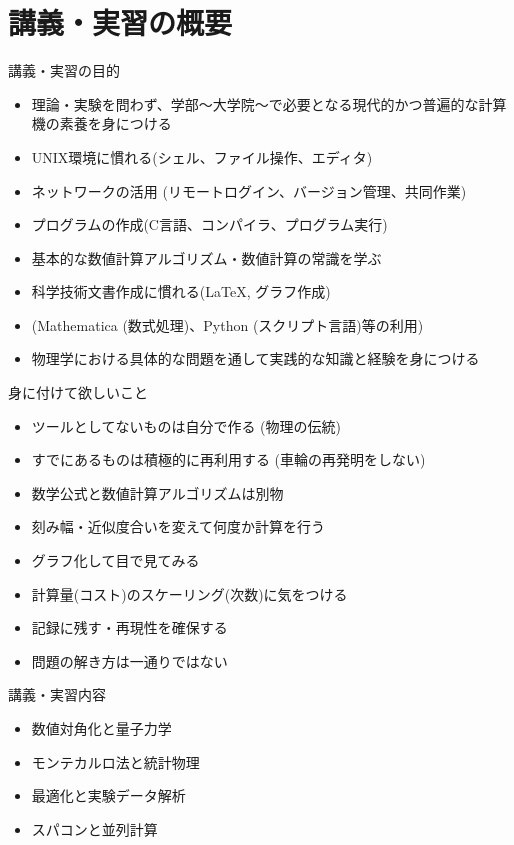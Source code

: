 \section{講義・実習の概要}

\begin{frame}[t]{講義・実習の目的}
  \begin{itemize}
  \item 理論・実験を問わず、学部〜大学院〜で必要となる現代的かつ普遍的な計算機の素養を身につける
  \item {\color{gray}UNIX環境に慣れる(シェル、ファイル操作、エディタ)}
  \item {\color{gray}ネットワークの活用 (リモートログイン、バージョン管理、共同作業)}
  \item {\color{gray}プログラムの作成(C言語、コンパイラ、プログラム実行)}
  \item 基本的な数値計算アルゴリズム・数値計算の常識を学ぶ
  \item {\color{gray}科学技術文書作成に慣れる(\LaTeX, グラフ作成)}
  \item {\color{gray}(Mathematica (数式処理)、Python (スクリプト言語)等の利用)}
  \item {\color{red}物理学における具体的な問題を通して実践的な知識と経験を身につける}
  \end{itemize}
\end{frame}

\begin{frame}[t]{身に付けて欲しいこと}
  \begin{itemize}
  \item ツールとしてないものは自分で作る (物理の伝統)
  \item すでにあるものは積極的に再利用する (車輪の再発明をしない)
  \item 数学公式と数値計算アルゴリズムは別物
  \item 刻み幅・近似度合いを変えて何度か計算を行う
  \item グラフ化して目で見てみる
  \item 計算量(コスト)のスケーリング(次数)に気をつける
  \item 記録に残す・再現性を確保する
  \item {\color{red}問題の解き方は一通りではない}
  \end{itemize}
\end{frame}

\begin{frame}[t]{講義・実習内容}
  \begin{itemize}
    \setlength{\itemsep}{1em}
  \item 数値対角化と量子力学
  \item モンテカルロ法と統計物理
  \item 最適化と実験データ解析
  \item {\color{gray}スパコンと並列計算}
  \end{itemize}
\end{frame}

